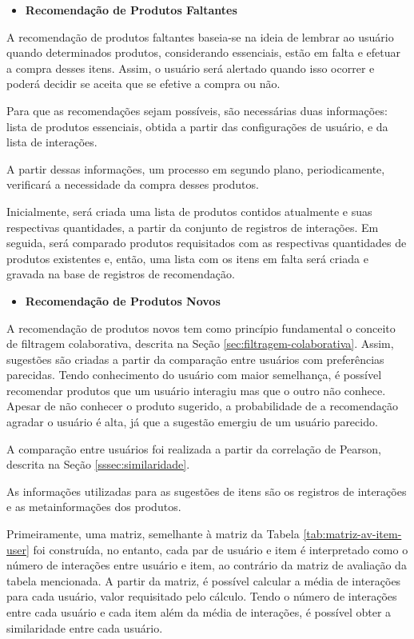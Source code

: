 \begin{itemize}
    \item \textbf{Recomendação de Produtos Faltantes}
\end{itemize}

A recomendação de produtos faltantes baseia-se na ideia de lembrar ao usuário quando determinados produtos, considerando essenciais, estão em falta e efetuar a compra desses itens. Assim, o usuário será alertado quando isso ocorrer e poderá decidir se aceita que se efetive a compra ou não.

Para que as recomendações sejam possíveis, são necessárias duas informações: lista de produtos essenciais, obtida a partir das configurações de usuário, e da lista de interações. 

A partir dessas informações, um processo em segundo plano, periodicamente, verificará a necessidade da compra desses produtos.

Inicialmente, será criada uma lista de produtos contidos atualmente e suas respectivas quantidades, a partir da conjunto de registros de interações. Em seguida, será comparado produtos requisitados com as respectivas quantidades de produtos existentes e, então, uma lista com os itens em falta será criada e gravada na base de registros de recomendação.

\begin{itemize}
    \item \textbf{Recomendação de Produtos Novos}
\end{itemize}

A recomendação de produtos novos tem como princípio fundamental o conceito de filtragem colaborativa, descrita na Seção \ref{sec:filtragem-colaborativa}. Assim, sugestões são criadas a partir da comparação entre usuários com preferências parecidas. Tendo conhecimento do usuário com maior semelhança, é possível recomendar produtos que um usuário interagiu mas que o outro não conhece. Apesar de não conhecer o produto sugerido, a probabilidade de a recomendação agradar o usuário é alta, já que a sugestão emergiu de um usuário parecido.

A comparação entre usuários foi realizada a partir da correlação de Pearson, descrita na Seção \ref{sssec:similaridade}.

As informações utilizadas para as sugestões de itens são os registros de interações e as metainformações dos produtos. 

Primeiramente, uma matriz, semelhante à matriz da Tabela \ref{tab:matriz-av-item-user} foi construída, no entanto, cada par de usuário e item é interpretado como o número de interações entre usuário e item, ao contrário da matriz de avaliação da tabela mencionada. A partir da matriz, é possível calcular a média de interações para cada usuário, valor requisitado pelo cálculo. Tendo o número de interações entre cada usuário e cada item além da média de interações, é possível obter a similaridade entre cada usuário.

